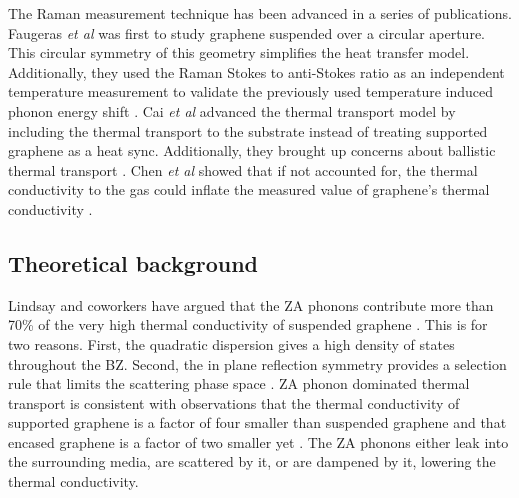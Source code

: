 The Raman measurement technique has been advanced in a series of publications.
Faugeras \textit{et al} was first to study graphene suspended over a circular aperture.
This circular symmetry of this geometry simplifies the heat transfer model.
Additionally, they used the Raman Stokes to anti-Stokes ratio as an independent temperature measurement to validate the previously used temperature induced phonon energy shift \cite{Faugeras2010}.
Cai \textit{et al} advanced the thermal transport model by including the thermal transport to the substrate instead of treating supported graphene as a heat sync.
Additionally, they brought up concerns about ballistic thermal transport \cite{Cai2010}.
Chen \textit{et al} showed that if not accounted for, the thermal conductivity to the gas could inflate the measured value of graphene's thermal conductivity \cite{Chen2011a}.


\subsection{Theoretical background}
Lindsay and coworkers have argued that the ZA phonons contribute more than 70\% of the very high thermal conductivity of suspended graphene \cite{Seol2010}.
This is for two reasons.
First, the quadratic dispersion gives a high density of states throughout the BZ.
Second, the in plane reflection symmetry provides a selection rule that limits the scattering phase space \cite{Lindsay2010}.
ZA phonon dominated thermal transport is consistent with observations that the thermal conductivity of supported graphene \cite{Seol2010,Cai2010} is a factor of four smaller than suspended graphene \cite{Balandin2008,Cai2010,Chen2011a,Lee2011} and that encased graphene is a factor of two smaller yet \cite{Jang2010}.
The ZA phonons either leak into the surrounding media, are scattered by it, or are dampened by it, lowering the thermal conductivity.


